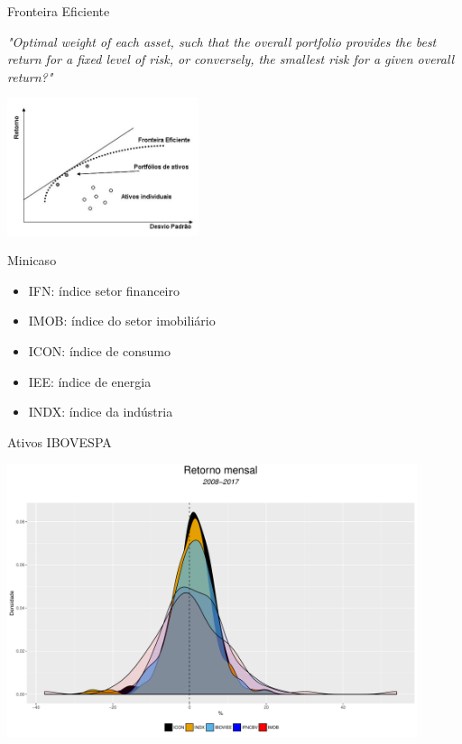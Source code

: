 \documentclass{beamer}
\begin{document}
\begin{frame}{Fronteira Eficiente}


\textit{"Optimal weight of each asset, such that the overall portfolio provides the best return for a fixed level of risk, or conversely, the smallest risk for a given overall
return?"} \cite{Laloux1999}



\begin{center}
 \includegraphics[height=4cm,keepaspectratio]{marko_02.png}
 \end{center}
 
\end{frame}


\begin{frame}{Minicaso}

\begin{itemize}
  \item IFN:  índice setor financeiro
  \item IMOB: índice do setor imobiliário
  \item ICON: índice de consumo
  \item IEE:  índice de energia
  \item INDX: índice da indústria
\end{itemize}

\end{frame}

\begin{frame}{Ativos  IBOVESPA}

\begin{center}
 \includegraphics[height=8cm,keepaspectratio]{decritiva_indices.pdf}
 \end{center}


\end{frame}
\end{document}

